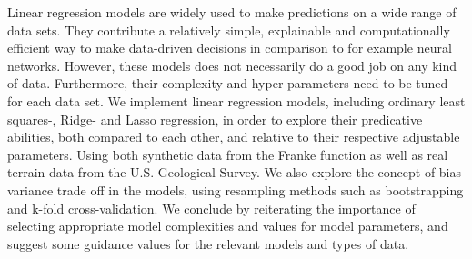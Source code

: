Linear regression models are widely used to make predictions on a wide range of data sets.
They contribute a relatively simple, explainable and computationally efficient way to make data-driven decisions in comparison to for example neural networks.
However, these models does not necessarily do a good job on any kind of data.
Furthermore, their complexity and hyper-parameters need to be tuned for each data set.
We implement linear regression models, including ordinary least squares-, Ridge- and Lasso regression, in order to explore their predicative abilities, both compared to each other, and relative to their respective adjustable parameters. 
Using both synthetic data from the Franke function \citep[p. 13]{frank} as well as real terrain data from the U.S. Geological Survey. 
We also explore the concept of bias-variance trade off in the models, using resampling methods such as bootstrapping and k-fold cross-validation. 
We conclude by reiterating the importance of selecting appropriate model complexities and values for model parameters, and suggest some guidance values for the relevant models and types of data. 
